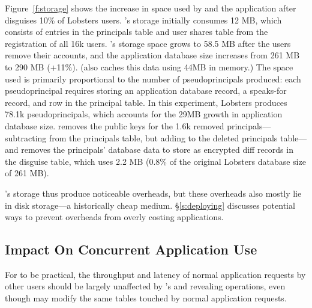 %
Figure~\ref{f:storage} shows the increase in space used by \sys and the
application after \sys disguises 10\% of Lobsters users. \sys's storage
initially consumes 12 MB, which consists of entries in the principals table and
user shares table from the registration of all 16k users.
%
\sys's storage space grows to 58.5 MB after the users remove their accounts, and
the application database size increases from 261 MB to 290 MB (+11\%).
%
(\sys also caches this data using 44MB in memory.)
%
The space used is primarily proportional to the number of pseudoprincipals
produced: each pseudoprincipal requires storing an application database record,
a speaks-for record, and row in the principal table.
%
In this experiment, Lobsters produces 78.1k pseudoprincipals, which accounts for
the 29MB growth in application database size.
%
%
%
%
\sys removes the public keys for the 1.6k removed principals---subtracting from
the principals table, but adding to the deleted principals table---and removes
the principals' database data to store as encrypted diff records in the disguise
table, which uses 2.2 MB (0.8\% of the original Lobsters database size of 261
MB).
%

\sys's storage thus produce noticeable overheads, but these overheads also
mostly lie in disk storage---a historically cheap medium.  \S\ref{s:deploying}
discusses potential ways to prevent \sys overheads from overly costing
applications.
%

\subsection{Impact On Concurrent Application Use}
\label{s:eval-conc}

%
%
%
For \sys to be practical, the throughput and latency of normal application
requests by other users should be largely unaffected by \sys's \xxing and
revealing operations, even though \sys may modify the same tables touched by
normal application requests.
%
%

